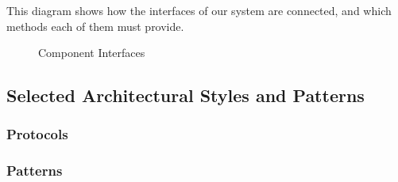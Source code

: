 \documentclass[english]{article}
\begin{document}
This diagram shows how the interfaces of our system are connected, and which methods each of them must provide.

\begin{figure}[H]
	\centering
	\caption{Component Interfaces}
	\label{compinterfaces}
\end{figure}

\subsection{Selected Architectural Styles and Patterns}


\subsubsection{Protocols}

\subsubsection{Patterns}
\end{document}
